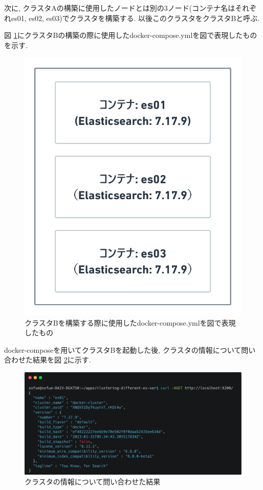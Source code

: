次に, クラスタAの構築に使用したノードとは別の3ノード(コンテナ名はそれぞれes01, es02, es03)でクラスタを構築する. 以後このクラスタをクラスタBと呼ぶ.

図 \ref{4-p10}にクラスタBの構築の際に使用したdocker-compose.ymlを図で表現したものを示す.

\begin{figure}[H]
  \begin{center}
    \includegraphics[width=120mm]{sotu/figure/all-7.19.9.png}
    \caption{クラスタBを構築する際に使用したdocker-compose.ymlを図で表現したもの}
    \label{4-p10}
  \end{center}
\end{figure}

docker-composeを用いてクラスタBを起動した後, クラスタの情報について問い合わせた結果を図 \ref{4-p11}に示す.

\begin{figure}[H]
  \begin{center}
    \includegraphics[width=140mm]{sotu/figure/3nodes-cluster.png}
    \caption{クラスタの情報について問い合わせた結果}
    \label{4-p11}
  \end{center}
\end{figure}

